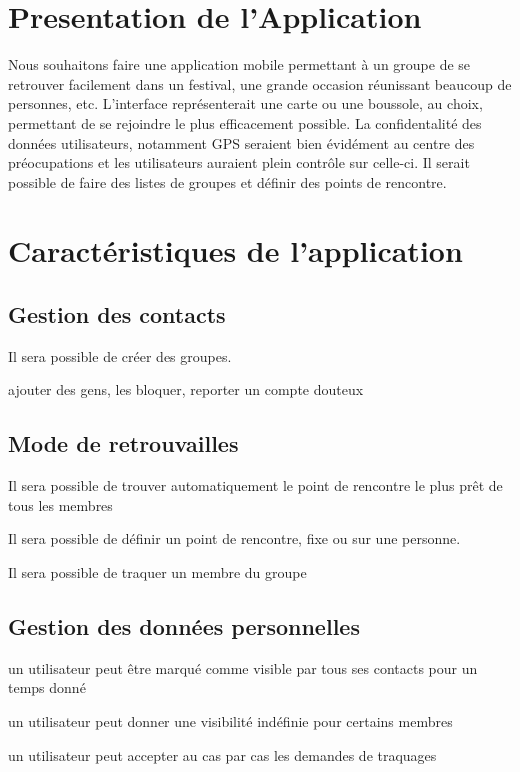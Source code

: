 \section{Presentation de l'Application}

Nous souhaitons faire une application mobile permettant à un groupe de se retrouver facilement dans un festival, une grande occasion réunissant beaucoup de personnes, etc.
 L'interface représenterait une carte ou une boussole, au choix, permettant de se rejoindre le plus efficacement possible.
 La confidentalité des données utilisateurs, notamment GPS seraient bien évidément au centre des préocupations et les utilisateurs auraient plein contrôle sur celle-ci.
 Il serait possible de faire des listes de groupes et définir des points de rencontre. 

\section{Caractéristiques de l'application}

\subsection{Gestion des contacts}

\item Il sera possible de créer des groupes.
\item ajouter des gens, les bloquer, reporter un compte douteux


\subsection{Mode de retrouvailles}

\item Il sera possible de trouver automatiquement le point de rencontre le plus prêt de tous les membres
\item Il sera possible de définir un point de rencontre, fixe ou sur une personne.
\item Il sera possible de traquer un membre du groupe


\subsection{Gestion des données personnelles}

\item un utilisateur peut être marqué comme visible par tous ses contacts pour un temps donné
\item un utilisateur peut donner une visibilité indéfinie pour certains membres
\item un utilisateur peut accepter au cas par cas les demandes de traquages



